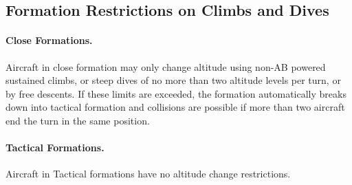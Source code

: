 \subsection{Formation Restrictions on Climbs and Dives}

\paragraph{Close Formations.} Aircraft in close formation may only change altitude using non-AB powered sustained climbs, or steep dives of no more than two altitude levels per turn, or by free descents. If these limits are exceeded, the formation automatically breaks down into tactical formation and collisions are possible if more than two aircraft end the turn in the same position.

\paragraph{Tactical Formations.} Aircraft in Tactical formations have no altitude change restrictions.
